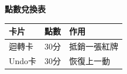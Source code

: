 \documentclass[11pt]{article}
\begin{document}
{\LARGE\bfseries 點數兌換表\par}
\vspace{1em}

\begin{tabular}{@{}lll@{}}
\toprule
\textbf{卡片} & \textbf{點數} & \textbf{作用} \\
\midrule
迴轉卡 & 30分 & 抵銷一張紅牌 \\
Undo卡 & 30分 & 恢復上一動 \\
\bottomrule
\end{tabular}
\end{document}
